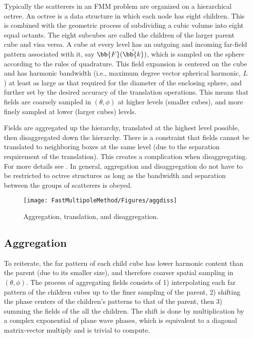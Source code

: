 Typically the scatterers in an FMM problem are organized on a hierarchical octree. An octree is a data structure in which each node has eight children. This is combined with the geometric process of subdividing a cubic volume into eight equal octants. The eight subcubes are called the children of the larger parent cube and visa versa. A cube at every level has an outgoing and incoming far-field pattern associated with it, say $\bb{F}(\hat {\bb{k}})$, which is sampled on the sphere according to the rules of quadrature. This field expansion is centered on the cube and has harmonic bandwidth (i.e., maximum degree vector spherical harmonic, $L$) at least as large as that required for the diameter of the enclosing sphere, and further set by the desired accuracy of the translation operations. This means that fields are coarsely sampled in $(\theta,\phi)$ at higher levels (smaller cubes), and more finely sampled at lower (larger cubes) levels.

Fields are aggregated up the hierarchy, translated at the highest level possible, then disaggregated down the hierarchy. There is a constraint that fields cannot be translated to neighboring boxes at the same level (due to the separation requirement of the translation). This creates a complication when disaggregating. For more details see \cite{yucel2008helmholtz}. In general, aggregation and disaggregation do not have to be restricted to octree structures as long as the bandwidth and separation between the groups of scatterers is obeyed. 


 \begin{figure}[h] 
   \centering
   \texttt{[image: FastMultipoleMethod/Figures/aggdiss]} 
   \caption{Aggregation, translation, and disaggregation. }
   \label{}
\end{figure}



\subsection{Aggregation}

To reiterate, the far pattern of each child cube has lower harmonic content than the parent (due to its smaller size), and therefore coarser spatial sampling in $(\theta,\phi)$. The process of aggregating fields consists of 1) interpolating each far pattern of the children cubes up to the finer sampling of the parent, 2) shifting the phase centers of the children's patterns to that of the parent, then 3) summing the fields of the all the children. The shift is done by multiplication by a complex exponential of plane wave phases, which is equivalent to a diagonal matrix-vector multiply and is trivial to compute. 

